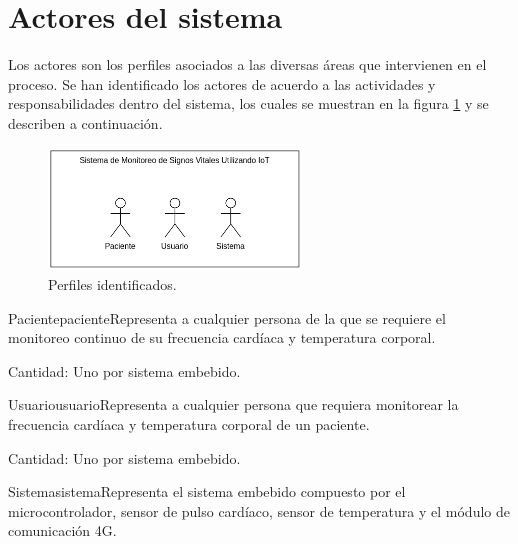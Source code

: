 \section{Actores del sistema}

Los actores son los perfiles asociados a las diversas áreas que intervienen en el proceso. Se han identificado los actores de acuerdo a las actividades y responsabilidades dentro del sistema, los cuales se muestran en la figura \ref{fig:perfiles} y se describen a continuación.


    \begin{figure}[htbp!]
      \begin{center}
      \includegraphics[width=0.6\textwidth]{ModeloComportamiento/imagenes/Actores.png}
      \caption{Perfiles identificados.}
      \label{fig:perfiles}
      \end{center}
    \end{figure}

\begin{actor}{Paciente}{paciente}{Representa a cualquier persona de la que se requiere el monitoreo continuo de su frecuencia cardíaca y temperatura corporal.}

	\item[Cantidad:] Uno por sistema embebido.

\end{actor}

\begin{actor}{Usuario}{usuario}{Representa a cualquier persona que requiera monitorear la frecuencia cardíaca y temperatura corporal de un paciente.}
	
	\item[Cantidad:] Uno por sistema embebido.
	
\end{actor}

\begin{actor}{Sistema}{sistema}{Representa el sistema embebido compuesto por el microcontrolador, sensor de pulso cardíaco, sensor de temperatura y el módulo de comunicación 4G.}
	
\end{actor}